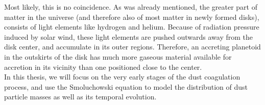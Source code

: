     Most likely, this is no coincidence. 
    As was already mentioned, the greater part of matter in the universe 
    (and therefore also of most matter in newly formed disks), 
    consists of light elements like hydrogen and helium. 
    Because of radiation pressure induced by solar wind, these light elements are pushed outwards 
    away from the disk center, and accumulate in its outer regions. 
    Therefore, an accreting planetoid in the outskirts of the disk has 
    much more gaseous material available for accretion in its vicinity than one positioned close to 
    the center. \\

    In this thesis, we will focus on the very early stages of the dust coagulation process, 
    and use the Smoluchowski equation to model the distribution 
    of dust particle masses as well as its temporal evolution. \\







